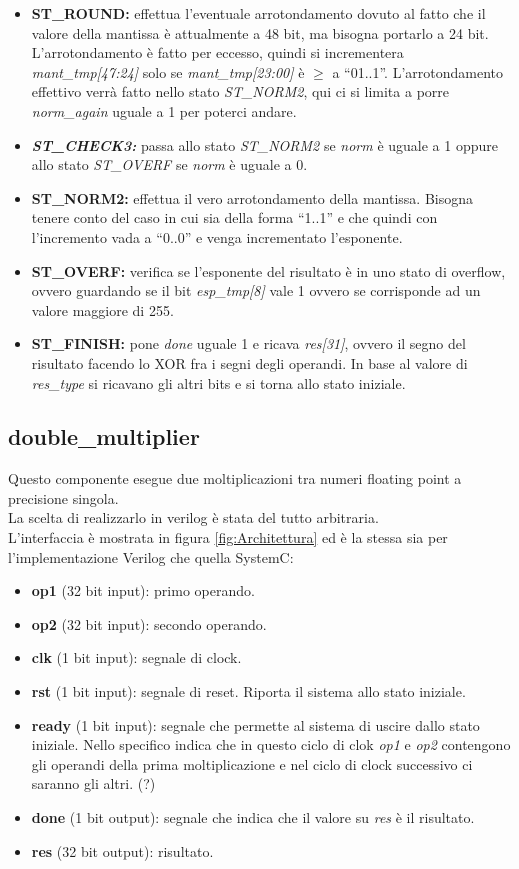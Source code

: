 \documentclass[]{IEEEtran}
\begin{document}
\begin{itemize}
    \item \textbf{ST\_ROUND:} effettua l'eventuale arrotondamento dovuto al fatto che il valore della mantissa è attualmente a 48 bit, ma bisogna portarlo a 24 bit. L'arrotondamento è fatto per eccesso, quindi si incrementera \textit{mant\_tmp[47:24]} solo se \textit{mant\_tmp[23:00]} è $\geq$ a ``01..1''. L'arrotondamento effettivo verrà fatto nello stato \textit{ST\_NORM2}, qui ci si limita a porre \textit{norm\_again} uguale a 1 per poterci andare.
    \item \textit{\textbf{ST\_CHECK3:}} passa allo stato \textit{ST\_NORM2} se \textit{norm} è uguale a 1 oppure allo stato \textit{ST\_OVERF} se \textit{norm} è uguale a 0.
    \item \textbf{ST\_NORM2:} effettua il vero arrotondamento della mantissa. Bisogna tenere conto del caso in cui sia della forma ``1..1'' e che quindi con l'incremento vada a ``0..0'' e  venga incrementato l'esponente.
    \item \textbf{ST\_OVERF:} verifica se l'esponente del risultato è in uno stato di overflow, ovvero guardando se il bit \textit{esp\_tmp[8]} vale 1 ovvero se corrisponde ad un valore maggiore di 255.
    \item \textbf{ST\_FINISH:} pone \textit{done} uguale 1 e ricava \textit{res[31]}, ovvero il segno del risultato facendo lo XOR fra i segni degli operandi. In base al valore di \textit{res\_type} si ricavano gli altri bits e si torna allo stato iniziale.
\end{itemize}


\subsection{double\_multiplier}
Questo componente esegue due moltiplicazioni tra numeri floating point a precisione singola.
\\La scelta di realizzarlo in verilog è stata del tutto arbitraria.
\\L'interfaccia è mostrata in figura \ref{fig:Architettura} ed è la stessa sia per l'implementazione Verilog che quella SystemC:
\begin{itemize}
    \item \textbf{op1} (32 bit input): primo operando.
    \item \textbf{op2} (32 bit input): secondo operando.
    \item \textbf{clk} (1 bit input): segnale di clock.
    \item \textbf{rst} (1 bit input): segnale di reset. Riporta il sistema allo stato iniziale.
    \item \textbf{ready} (1 bit input): segnale che permette al sistema di uscire dallo stato iniziale. Nello specifico indica che in questo ciclo di clok \textit{op1} e \textit{op2} contengono gli operandi della prima moltiplicazione e nel ciclo di clock successivo ci saranno gli altri. (?)
    \item \textbf{done} (1 bit output): segnale che indica che il valore su \textit{res} è il risultato.
    \item \textbf{res} (32 bit output): risultato.
\end{itemize}
    
\end{document}
